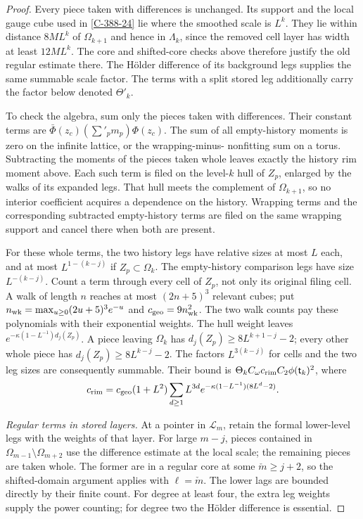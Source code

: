 \documentclass[11pt,letterpaper,reqno]{amsart}
\theoremstyle{definition}
\theoremstyle{remark}
\begin{document}
\begin{proof}
Every piece taken with differences is unchanged.
Its support and the local gauge cube used in
\cref{C-388-24} lie where the smoothed scale is
$L^k$. They lie within distance $8ML^k$ of
$\Omega_{k+1}$ and hence in $\Lambda_k$, since
the removed cell layer has width at least
$12ML^k$. The core and shifted-core checks
above therefore justify the old regular estimate
there. The H\"older difference of its background
legs supplies the same summable scale factor.
The terms with a split stored leg additionally
carry the factor below denoted $\Theta'_k$.

To check the algebra, sum only the pieces taken
with differences. Their constant terms are
$\bar\Phi(z_c)(\sum'_p m_p)\Phi(z_c)$.
The sum of all empty-history moments is zero
on the infinite lattice, or the wrapping-minus-
nonfitting sum on a torus. Subtracting the
moments of the pieces taken whole leaves exactly
the history rim moment above. Each such term
is filed on the level-$k$ hull of $Z_p$,
enlarged by the walks of its expanded legs.
That hull meets the complement of
$\Omega_{k+1}$, so no interior coefficient
acquires a dependence on the history.
Wrapping terms and the corresponding subtracted
empty-history terms are filed on the same
wrapping support and cancel there when both
are present.

For these whole terms, the two history legs
have relative sizes at most $L$ each, and at
most $L^{1-(k-j)}$ if $Z_p\subset\Omega_k$.
The empty-history comparison legs have size
$L^{-(k-j)}$. Count a term through every
cell of $Z_p$, not only its original filing
cell. A walk of length $n$ reaches at most
$(2n+5)^3$ relevant cubes; put
$n_{\rm wk}=\max_{u\ge0}(2u+5)^3e^{-u}$ and
$c_{\rm geo}=9n_{\rm wk}^2$.
The two walk counts pay these polynomials
with their exponential weights. The hull
weight leaves
$e^{-\kappa(1-L^{-1})d_j(Z_p)}$.
A piece leaving $\Omega_k$ has
$d_j(Z_p)\ge8L^{k+1-j}-2$; every other
whole piece has $d_j(Z_p)\ge8L^{k-j}-2$.
The factors $L^{3(k-j)}$ for cells and the
two leg sizes are consequently summable.
Their bound is
$\Theta_k C_\omega c_{\rm rim}C_2\phi(\mathsf t_k)^2$,
where
\[
 c_{\rm rim}=c_{\rm geo}(1+L^2)
       \sum_{d\ge1}L^{3d}
                      e^{-\kappa(1-L^{-1})(8L^d-2)}.
\]

\emph{Regular terms in stored layers.}
At a pointer in $\mathcal L_m$, retain the
formal lower-level legs with the weights of
that layer. For large $m-j$, pieces contained
in $\Omega_{m-1}\setminus\Omega_{m+2}$ use
the difference estimate at the local scale;
the remaining pieces are taken whole.
The former are in a regular core at some
$\check m\ge j+2$, so the shifted-domain
argument applies with $\ell=\check m$.
The lower lags are bounded directly by
their finite count. For degree at least
four, the extra leg weights supply the
power counting; for degree two the
H\"older difference is essential.


\end{proof}
\end{document}
